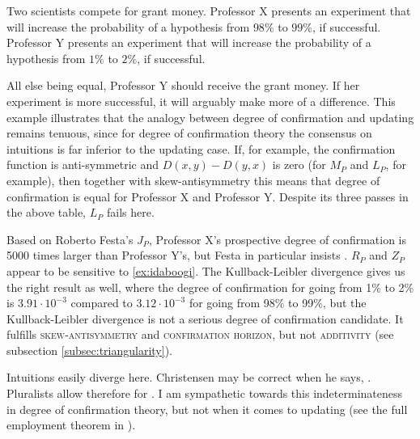 \documentclass[11pt]{article}
\begin{document}
\begin{quotex}
  \label{ex:idaboogi} Two scientists
  compete for grant money. Professor X presents an experiment that
  will increase the probability of a hypothesis from $98\%$ to $99\%$,
  if successful. Professor Y presents an experiment that will increase
  the probability of a hypothesis from $1\%$ to $2\%$, if successful.
\end{quotex}

All else being equal, Professor Y should receive the grant money. If
her experiment is more successful, it will arguably make more of a
difference. This example illustrates that the analogy between degree
of confirmation and updating remains tenuous, since for degree of
confirmation theory the consensus on intuitions is far inferior to the
updating case. If, for example, the confirmation function is
anti-symmetric and $D(x,y)-D(y,x)$ is zero (for $M_{P}$ and $L_{P}$,
for example), then together with skew-antisymmetry this means that
degree of confirmation is equal for Professor X and Professor Y.
Despite its three passes in the above table, $L_{P}$ fails here.

Based on Roberto Festa's $J_{P}$, Professor X's prospective degree of
confirmation is 5000 times larger than Professor Y's, but Festa in
particular insists 
. $R_{P}$ and $Z_{P}$ appear to be sensitive to
{\xample} \ref{ex:idaboogi}. The Kullback-Leibler divergence gives us
the right result as well, where the degree of confirmation for going
from 1\% to 2\% is $3.91\cdot{}10^{-3}$ compared to
$3.12\cdot{}10^{-3}$ for going from 98\% to 99\%, but the
Kullback-Leibler divergence is not a serious degree of confirmation
candidate. It fulfills \textsc{skew-antisymmetry} and
\textsc{confirmation horizon}, but not \textsc{additivity} (see
subsection \ref{subsec:triangularity}).

Intuitions easily diverge here. Christensen may be correct when he
says, 
. Pluralists allow therefore for
. I am sym\-path\-etic towards this
indeterminateness in degree of confirmation theory, but not when it
comes to updating (see the full employment theorem in
).
\end{document}
